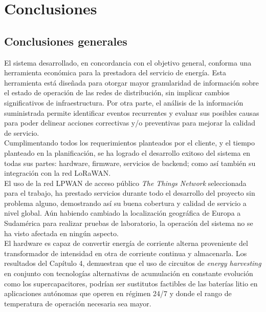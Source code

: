 
\chapter{Conclusiones} %

\label{Chapter5} %




\section{Conclusiones generales }
El sistema desarrollado, en concordancia con el objetivo general, conforma una herramienta económica para la prestadora del servicio de energía. Esta herramienta está diseñada para otorgar mayor granularidad de información sobre el estado de operación de las redes de distribución, sin implicar cambios significativos de infraestructura. Por otra parte, el análisis de la información suministrada permite identificar eventos recurrentes y evaluar sus posibles causas para poder delinear acciones correctivas y/o preventivas para mejorar la calidad de servicio.\\
Cumplimentando todos los requerimientos planteados por el cliente, y el tiempo planteado en la planificación, se ha logrado el desarrollo exitoso del sistema en todas sus partes: hardware, firmware, servicios de backend; como así también su integración con la red LoRaWAN.\\
El uso de la red LPWAN de acceso público \textit{The Things Network} seleccionada para el trabajo, ha prestado servicios durante todo el desarrollo del proyecto sin problema alguno, demostrando así su buena cobertura y calidad de servicio a nivel global. A\'{u}n habiendo cambiado la localización geográfica de Europa a Sudamérica para realizar pruebas de laboratorio, la operación del sistema no se ha visto afectada en ningún aspecto.\\
El hardware es capaz de convertir energía de corriente alterna proveniente del transformador de intensidad en otra de corriente continua y almacenarla. Los resultados del Capítulo 4, demuestran que el uso de circuitos de \textit{energy harvesting} en conjunto con tecnologías alternativas de acumulación en constante evolución como los supercapacitores, podrían ser sustitutos factibles de las baterías litio en aplicaciones autónomas que operen en régimen 24/7 y donde el rango de temperatura de operación necesaria sea mayor.\\
